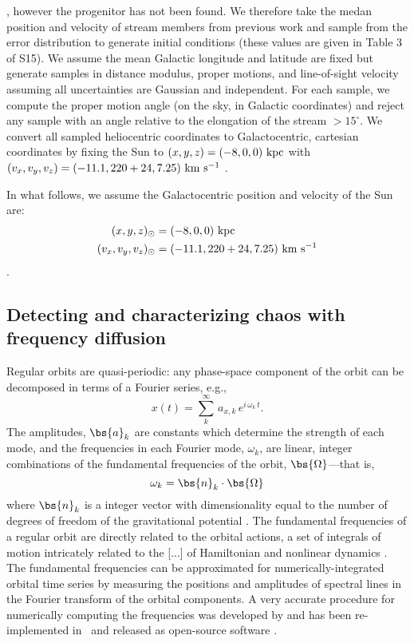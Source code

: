 \documentclass[letterpaper,12pt,preprint]{aastex}
\begin{document}
, however the progenitor has not been found. We therefore take the medan position and velocity of stream members  from previous work and sample from the error distribution to generate initial conditions (these values are given in Table 3 of S15). We assume the mean Galactic longitude and latitude are fixed but generate samples in distance modulus, proper motions, and line-of-sight velocity assuming all uncertainties are Gaussian and independent. For each sample, we compute the proper motion angle (on the sky, in Galactic coordinates) and reject any sample with an angle relative to the elongation of the stream $>15^\circ$. We convert all sampled heliocentric coordinates to Galactocentric, cartesian coordinates by fixing the Sun to $(x,y,z) = (-8,0,0)~{\rm kpc}$ with $(v_x,v_y,v_z) = (-11.1, 220+24, 7.25)~{\rm km}~{\rm s}^{-1}$ \citep{schonrich10, bovy12}. 

In what follows, we assume the Galactocentric position and velocity of the Sun are: 
\begin{align}
	(x,y,z)_\odot &= (-8,0,0)~{\rm kpc}\\
	(v_x,v_y,v_z)_\odot &= (-11.1, 220+24, 7.25)~{\rm km}~{\rm s}^{-1}
\end{align}
\citep{8kpref??, schonrich10, bovy12}. 

\subsection{Detecting and characterizing chaos with frequency diffusion}\label{sec:chaos-indicator}

Regular orbits are quasi-periodic: any phase-space component of the orbit can be decomposed in terms of a Fourier series, e.g.,
\begin{equation}
	x(t) = \sum^\infty_k \, a_{x,k}\, e^{i\, \omega_k \, t}.
\end{equation}
The amplitudes, $\bs{a}_k$ are constants which determine the strength of each mode, and the frequencies in each Fourier mode, $\omega_k$, are linear, integer combinations of the fundamental frequencies of the orbit, $\bs{\Omega}$---that is,
\begin{equation}
	\omega_k = \bs{n}_k \cdot \bs{\Omega}
\end{equation}
where $\bs{n}_k$ is a integer vector with dimensionality equal to the number of degrees of freedom of the gravitational potential \citep[e.g.,][]{binney82, binneytremaine}. The fundamental frequencies of a regular orbit are directly related to the orbital actions, a set of integrals of motion intricately related to the [...] of Hamiltonian and nonlinear dynamics \citep[e.g.,][]{??}. The fundamental frequencies can be approximated for numerically-integrated orbital time series by measuring the positions and amplitudes of spectral lines in the Fourier transform of the orbital components. A very accurate procedure for numerically computing the frequencies was developed by \citet{laskar93} and has been re-implemented in \python\ and released as open-source software \citep[\superfreq;][]{superfreq}. 
\end{document}
